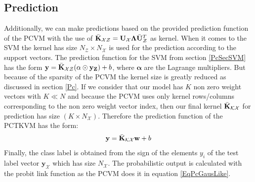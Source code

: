 \subsection{Prediction}\label{InSubSecPrediction}
Additionally, we can make predictions based on the provided prediction function of the \acs{PCVM} with the use of $\bar{\mathbf{K}}_\mathcal{XZ} = \mathbf{U}_\mathcal{X}\mathbf{\Lambda}\bar{\mathbf{U}}_\mathcal{Z}^T$ as kernel.
When it comes to the \acs{SVM} the kernel has size $N_\mathcal{Z}\times N_\mathcal{X}$ is used for the prediction according to the support vectors.
The prediction function for the \acs{SVM} from section \ref{PcSecSVM} has the form $\mathbf{y} = \bar{\mathbf{K}}_\mathcal{XZ}(\mathbf{\alpha}\odot\mathbf{y}_\mathbf{Z})+b$, where $\mathbf{\alpha}$ are the Lagrange multipliers.\cite{Long.2015}\newline
But because of the sparsity of the \acs{PCVM} the kernel size is greatly reduced as discussed in section \ref{Pc}.
If we consider that our model has $K$ non zero weight vectors with $K\ll N$ and because the \acs{PCVM} uses only kernel rows/columns corresponding to the non zero weight vector index, then our final kernel $\bar{\mathbf{K}}_\mathcal{KX}$ for prediction has size $(K\times N_\mathcal{X})$.
Therefore the prediction function of the \acs{PCTKVM} has the form:
\begin{equation}
\mathbf{y} = \bar{\mathbf{K}}_\mathcal{KX}\mathbf{w}+b
\end{equation}
Finally, the class label is obtained from the sign of the elements $y_i$ of the test label vector $\mathbf{y}_\mathcal{X}$ which has size $N_\mathcal{X}$.
The probabilistic output is calculated with the probit link function as the \acs{PCVM} does it in equation \ref{EqPcGausLike}.

